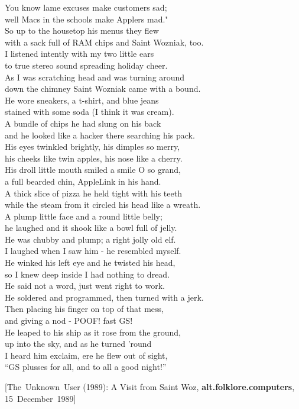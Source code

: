 \documentclass{report}
\newcommand{\citeusenet}[7]{%
    \rmfamily\footnotesize[\mbox{#1} (#3): #4, {\bfseries#5}, \mbox{#7 #3}]}
\newenvironment{usenet}{\raggedright\small\ttfamily}{\rmfamily}
\begin{document}
\begin{usenet}
        You know lame excuses make customers sad;\\
        well Macs in the schools make Applers mad."\\
        So up to the housetop his menus they flew\\
        with a sack full of RAM chips and Saint Wozniak, too.\\
        I listened intently with my two little ears\\
        to true stereo sound spreading holiday cheer.\\
        As I was scratching head and was turning around\\
        down the chimney Saint Wozniak came with a bound.\\
        He wore sneakers, a t-shirt, and blue jeans\\
        stained with some soda (I think it was cream).\\
        A bundle of chips he had slung on his back\\
        and he looked like a hacker there searching his pack.\\
        His eyes twinkled brightly, his dimples so merry,\\
        his cheeks like twin apples, his nose like a cherry.\\
        His droll little mouth smiled a smile O so grand,\\
        a full bearded chin, AppleLink in his hand.\\
        A thick slice of pizza he held tight with his teeth\\
        while the steam from it circled his head like a wreath.\\
        A plump little face and a round little belly;\\
        he laughed and it shook like a bowl full of jelly.\\
        He was chubby and plump; a right jolly old elf.\\
        I laughed when I saw him - he resembled myself.\\
        He winked his left eye and he twisted his head,\\
        so I knew deep inside I had nothing to dread.\\
        He said not a word, just went right to work.\\
        He soldered and programmed, then turned with a jerk.\\
        Then placing his finger on top of that mess,\\
        and giving a nod - POOF! fast GS!\\
        He leaped to his ship as it rose from the ground,\\
        up into the sky, and as he turned 'round\\
        I heard him exclaim, ere he flew out of sight,\\
        ``GS plusses for all, and to all a good night!''

        \citeusenet{The Unknown User}{unknown@ucscb.ucsc.edu}{1989}{A Visit from Saint Woz}{alt.folklore.computers}{\_mXEGBQNF\_A}
            {15 December}
    \end{usenet}
\end{document}
